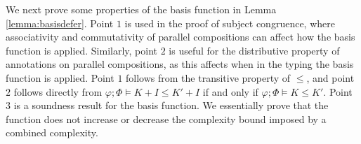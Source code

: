 %
We next prove some properties of the basis function in Lemma \ref{lemma:basisdefer}. Point $1$ is used in the proof of subject congruence, where associativity and commutativity of parallel compositions can affect how the basis function is applied. Similarly, point $2$ is useful for the distributive property of annotations on parallel compositions, as this affects when in the typing the basis function is applied. Point $1$ follows from the transitive property of $\leq$, and point $2$ follows directly from $\varphi;\Phi\vDash K + I \leq K' + I$ if and only if $\varphi;\Phi\vDash K \leq K'$. Point $3$ is a soundness result for the basis function. We essentially prove that the function does not increase or decrease the complexity bound imposed by a combined complexity. 
%
